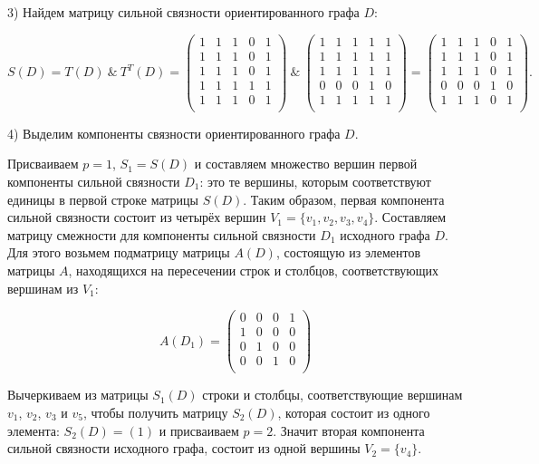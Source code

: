 \documentclass[fleqn]{article}
\begin{document}
3) Найдем матрицу сильной связности ориентированного графа $D$:

$$S(D)= T(D) \:\&\: T^T(D)=
\begin{pmatrix}
1 & 1 & 1 & 0 & 1\\
1 & 1 & 1 & 0 & 1\\
1 & 1 & 1 & 0 & 1\\
1 & 1 & 1 & 1 & 1\\
1 & 1 & 1 & 0 & 1\\
\end{pmatrix}
\:\&\:
\begin{pmatrix}
1 & 1 & 1 & 1 & 1\\
1 & 1 & 1 & 1 & 1\\
1 & 1 & 1 & 1 & 1\\
0 & 0 & 0 & 1 & 0\\
1 & 1 & 1 & 1 & 1\\
\end{pmatrix}
=\begin{pmatrix}
1 & 1 & 1 & 0 & 1\\
1 & 1 & 1 & 0 & 1\\
1 & 1 & 1 & 0 & 1\\
0 & 0 & 0 & 1 & 0\\
1 & 1 & 1 & 0 & 1\\
\end{pmatrix}.
$$

4) Выделим компоненты связности ориентированного графа $D$.

Присваиваем $p=1$, $S_1 = S(D)$ и составляем множество вершин
первой компоненты сильной связности $D_1$: это те вершины, которым соответствуют единицы в первой строке матрицы $S(D)$. Таким образом, первая компонента сильной связности состоит из четырёх вершин $V_1=\{v_1, v_2, v_3, v_4\}$. Составляем матрицу смежности для компоненты сильной связности $D_1$ исходного графа $D$. Для этого возьмем подматрицу матрицы $A(D)$, состоящую из элементов матрицы $A$, находящихся на пересечении строк и столбцов, соответствующих вершинам из $V_1$:

$$A(D_1)=
\begin{pmatrix}
0 & 0 & 0 & 1\\
1 & 0 & 0 & 0\\
0 & 1 & 0 & 0\\
0 & 0 & 1 & 0\\
\end{pmatrix}
$$

Вычеркиваем из матрицы $S_1(D)$ строки и столбцы,
соответствующие вершинам $v_1$, $v_2$, $v_3$ и $v_5$, чтобы получить матрицу $S_2(D)$, которая состоит из одного элемента: $S_2(D)=(1)$
и присваиваем $p=2$. Значит вторая компонента сильной связности исходного графа, состоит из одной вершины $V_2 = \{v_4\}$.
\end{document}
